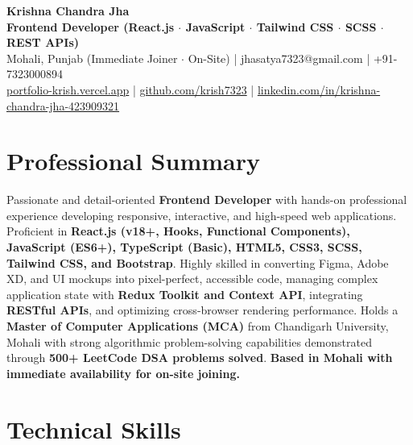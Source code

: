 \documentclass[a4paper,10pt]{article}
\begin{document}
\begin{center}

    {\LARGE \textbf{Krishna Chandra Jha}} \\[2.5pt]

    \textbf{Frontend Developer (React.js $\cdot$ JavaScript $\cdot$ Tailwind CSS $\cdot$ SCSS $\cdot$ REST APIs)} \\[3.5pt]

    Mohali, Punjab (Immediate Joiner $\cdot$ On-Site)
    \quad | \quad
    jhasatya7323@gmail.com
    \quad | \quad
    +91-7323000894
    \\[2.5pt]

    \href{https://portfolio-ashen-alpha-dv0whhsamo.vercel.app/}{portfolio-krish.vercel.app}
    \quad | \quad
    \href{https://github.com/krish7323}{github.com/krish7323}
    \quad | \quad
    \href{https://linkedin.com/in/krishna-chandra-jha-423909321}
    {linkedin.com/in/krishna-chandra-jha-423909321}

\end{center}

\section*{Professional Summary}

Passionate and detail-oriented \textbf{Frontend Developer} with hands-on professional experience developing responsive, interactive, and high-speed web applications. Proficient in \textbf{React.js (v18+, Hooks, Functional Components), JavaScript (ES6+), TypeScript (Basic), HTML5, CSS3, SCSS, Tailwind CSS, and Bootstrap}. Highly skilled in converting Figma, Adobe XD, and UI mockups into pixel-perfect, accessible code, managing complex application state with \textbf{Redux Toolkit and Context API}, integrating \textbf{RESTful APIs}, and optimizing cross-browser rendering performance. Holds a \textbf{Master of Computer Applications (MCA)} from Chandigarh University, Mohali with strong algorithmic problem-solving capabilities demonstrated through \textbf{500+ LeetCode DSA problems solved}. \textbf{Based in Mohali with immediate availability for on-site joining.}

\section*{Technical Skills}
\end{document}
